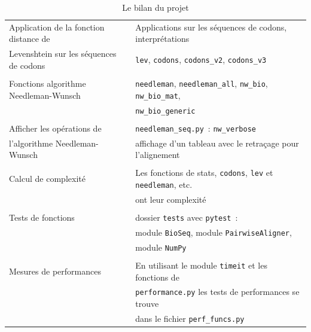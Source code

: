 \documentclass[12pt]{article}
\begin{document}
\begin{table}[!h]
\begin{tabular}{|l|l|}
                Application de la fonction distance de & Applications sur les séquences de codons, interprétations \\
                Levenshtein sur les séquences de codons & \texttt{lev}, \texttt{codons}, \texttt{codons\_v2}, \texttt{codons\_v3} \\
                 & \\
                 Fonctions algorithme Needleman-Wunsch & \texttt{needleman}, \texttt{needleman\_all}, \texttt{nw\_bio}, \texttt{nw\_bio\_mat}, \\
                 & \texttt{nw\_bio\_generic} \\
                 & \\
                Afficher les opérations de & \texttt{needleman\_seq.py}~: \texttt{nw\_verbose} \\
                l'algorithme Needleman-Wunsch & affichage d'un tableau avec le retraçage pour l'alignement\\
                 & \\
                Calcul de complexité & Les fonctions de stats, \texttt{codons}, \texttt{lev} et \texttt{needleman}, etc. \\
                 & ont leur complexité \\
                 & \\
                Tests de fonctions & dossier \texttt{tests} avec \texttt{pytest}~: \\
                 & module \texttt{BioSeq}, module \texttt{PairwiseAligner},\\ 
                 & module \texttt{NumPy} \\
                 & \\
                Mesures de performances & En utilisant le module \texttt{timeit} et les fonctions de \\
                 & \texttt{performance.py} les tests de performances se trouve   \\
                 & dans le fichier \texttt{perf\_funcs.py} \\
                \hline
            \end{tabular}
            \caption{Le bilan du projet}
            \label{tab:bilan}
        \end{table}
\end{document}
